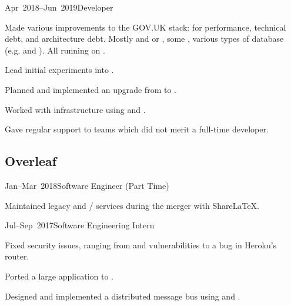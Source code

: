 \documentclass[a4paper]{barrucadu-cv}
\newcommand{\range}[2]{#1–#2}
\begin{document}
\begin{cventry}{\range{Apr~2018}{Jun~2019}}{Developer}
  \begin{tightitemize}
  \item Made various improvements to the GOV.UK stack: for
    performance, technical debt, and architecture debt.  Mostly
     and  or , some
    , various types of database
    (e.g.  and ).  All running on
    .

  \item Lead initial experiments into .

  \item Planned and implemented an upgrade from  to .

  \item Worked with  infrastructure using
     and .

  \item Gave regular support to teams which did not merit a full-time
    developer.
  \end{tightitemize}
\end{cventry}

\subsection{Overleaf}

\begin{cventry}{\range{Jan}{Mar}~2018}{Software Engineer (Part Time)}
  \begin{tightitemize}
  \item Maintained legacy  and  /
     services during the merger with ShareLaTeX.
  \end{tightitemize}
\end{cventry}

\begin{cventry}{\range{Jul}{Sep}~2017}{Software Engineering Intern}
  \begin{tightitemize}
  \item Fixed security issues, ranging from  and
     vulnerabilities to a bug in Heroku's router.

  \item Ported a large  application to .

  \item Designed and implemented a distributed message bus using
     and .
  \end{tightitemize}
\end{cventry}
\end{document}
